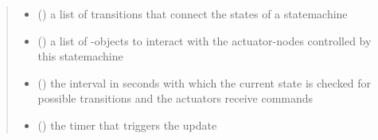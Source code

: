 \documentclass[a4paper,12pt,english]{article}
\begin{document}
\begin{fulllineitems}
\begin{quote}
\begin{description}
\begin{itemize}
\item {} 
 (\sphinxstyleliteralemphasis{\sphinxupquote{{[}}}{\hyperref[\detokenize{osbk_operation:osbk_operation.utility.Transition}]{\sphinxcrossref{\sphinxstyleliteralemphasis{\sphinxupquote{Transition}}}}}\sphinxstyleliteralemphasis{\sphinxupquote{{]}}}) \textendash{} a list of transitions that connect the states of a statemachine

\item {} 
 (\sphinxstyleliteralemphasis{\sphinxupquote{{[}}}{\hyperref[\detokenize{osbk_operation:osbk_operation.actuator_state_machine.ActuatorEntry}]{\sphinxcrossref{\sphinxstyleliteralemphasis{\sphinxupquote{ActuatorEntry}}}}}\sphinxstyleliteralemphasis{\sphinxupquote{{]}}}) \textendash{} a list of -objects to interact with the actuator-nodes
controlled by this statemachine

\item {} 
 () \textendash{} the interval in seconds with which the current state is checked for possible
transitions and the actuators receive commands

\item {} 
 () \textendash{} the timer that triggers the update

\end{itemize}

\end{description}\end{quote}

\end{fulllineitems}

\label{\detokenize{osbk_operation:module-osbk_operation.utility}}
\end{document}
